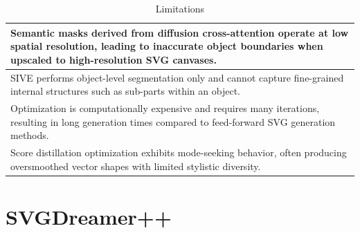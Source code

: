 \begin{table}[h!]
\centering
\caption{Limitations}
\begin{tabular}{|p{14cm}|}
\hline
Semantic masks derived from diffusion cross-attention operate at low spatial resolution, leading to inaccurate object boundaries when upscaled to high-resolution SVG canvases. \\ \hline

SIVE performs object-level segmentation only and cannot capture fine-grained internal structures such as sub-parts within an object. \\ \hline

Optimization is computationally expensive and requires many iterations, resulting in long generation times compared to feed-forward SVG generation methods. \\ \hline

Score distillation optimization exhibits mode-seeking behavior, often producing oversmoothed vector shapes with limited stylistic diversity. \\ \hline
\end{tabular}
\end{table}


\newpage
\chapter{SVGDreamer++}

